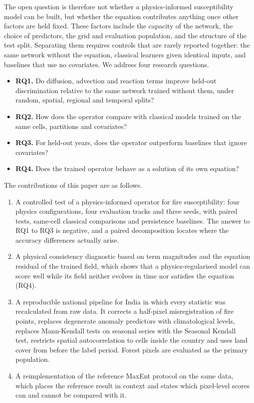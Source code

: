 \documentclass[journal]{IEEEtran}
\begin{document}
The open question is therefore not whether a physics-informed susceptibility model can be built, but whether the equation contributes anything once other factors are held fixed. These factors include the capacity of the network, the choice of predictors, the grid and evaluation population, and the structure of the test split. Separating them requires controls that are rarely reported together: the same network without the equation, classical learners given identical inputs, and baselines that use no covariates. We address four research questions.
\begin{itemize}
\item \textbf{RQ1.} Do diffusion, advection and reaction terms improve held-out discrimination relative to the same network trained without them, under random, spatial, regional and temporal splits?
\item \textbf{RQ2.} How does the operator compare with classical models trained on the same cells, partitions and covariates?
\item \textbf{RQ3.} For held-out years, does the operator outperform baselines that ignore covariates?
\item \textbf{RQ4.} Does the trained operator behave as a solution of its own equation?
\end{itemize}

The contributions of this paper are as follows.
\begin{enumerate}
\item A controlled test of a physics-informed operator for fire susceptibility: four physics configurations, four evaluation tracks and three seeds, with paired tests, same-cell classical comparisons and persistence baselines. The answer to RQ1 to RQ3 is negative, and a paired decomposition locates where the accuracy differences actually arise.
\item A physical consistency diagnostic based on term magnitudes and the equation residual of the trained field, which shows that a physics-regularised model can score well while its field neither evolves in time nor satisfies the equation (RQ4).
\item A reproducible national pipeline for India in which every statistic was recalculated from raw data. It corrects a half-pixel misregistration of fire points, replaces degenerate anomaly predictors with climatological levels, replaces Mann-Kendall tests on seasonal series with the Seasonal Kendall test, restricts spatial autocorrelation to cells inside the country and uses land cover from before the label period. Forest pixels are evaluated as the primary population.
\item A reimplementation of the reference MaxEnt protocol on the same data, which places the reference result in context and states which pixel-level scores can and cannot be compared with it.
\end{enumerate}
\end{document}
